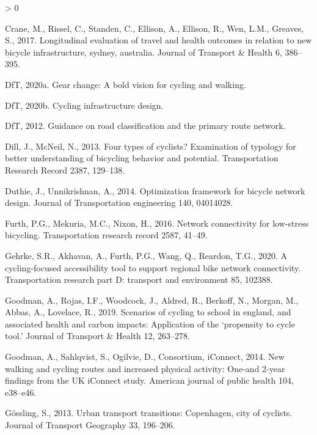 \documentclass[
]{article}
\newlength{\cslhangindent}
\newenvironment{CSLReferences}[2] %
 {%
  \setlength{\parindent}{0pt}
  \ifodd #1 \everypar{\setlength{\hangindent}{\cslhangindent}}\ignorespaces\fi
  \ifnum #2 > 0
  \setlength{\parskip}{#2\baselineskip}
  \fi
 }%
 {}
\begin{document}
\begin{CSLReferences}{1}{0}
\leavevmode\hypertarget{ref-crane2017longitudinal}{}%
Crane, M., Rissel, C., Standen, C., Ellison, A., Ellison, R., Wen, L.M., Greaves, S., 2017. Longitudinal evaluation of travel and health outcomes in relation to new bicycle infrastructure, sydney, australia. Journal of Transport \& Health 6, 386--395.

\leavevmode\hypertarget{ref-departmentgearchange2020}{}%
DfT, 2020a. Gear change: A bold vision for cycling and walking.

\leavevmode\hypertarget{ref-departmentcycleinfradesign2020}{}%
DfT, 2020b. Cycling infrastructure design.

\leavevmode\hypertarget{ref-department2012guidance}{}%
DfT, 2012. Guidance on road classification and the primary route network.

\leavevmode\hypertarget{ref-dill2013four}{}%
Dill, J., McNeil, N., 2013. Four types of cyclists? Examination of typology for better understanding of bicycling behavior and potential. Transportation Research Record 2387, 129--138.

\leavevmode\hypertarget{ref-duthie2014optimization}{}%
Duthie, J., Unnikrishnan, A., 2014. Optimization framework for bicycle network design. Journal of Transportation engineering 140, 04014028.

\leavevmode\hypertarget{ref-furth2016network}{}%
Furth, P.G., Mekuria, M.C., Nixon, H., 2016. Network connectivity for low-stress bicycling. Transportation research record 2587, 41--49.

\leavevmode\hypertarget{ref-gehrke2020cycling}{}%
Gehrke, S.R., Akhavan, A., Furth, P.G., Wang, Q., Reardon, T.G., 2020. A cycling-focused accessibility tool to support regional bike network connectivity. Transportation research part D: transport and environment 85, 102388.

\leavevmode\hypertarget{ref-goodman2019scenarios}{}%
Goodman, A., Rojas, I.F., Woodcock, J., Aldred, R., Berkoff, N., Morgan, M., Abbas, A., Lovelace, R., 2019. Scenarios of cycling to school in england, and associated health and carbon impacts: Application of the {`propensity to cycle tool.'} Journal of Transport \& Health 12, 263--278.

\leavevmode\hypertarget{ref-goodman2014new}{}%
Goodman, A., Sahlqvist, S., Ogilvie, D., Consortium, iConnect, 2014. New walking and cycling routes and increased physical activity: One-and 2-year findings from the UK iConnect study. American journal of public health 104, e38--e46.

\leavevmode\hypertarget{ref-gossling2013urban}{}%
Gössling, S., 2013. Urban transport transitions: Copenhagen, city of cyclists. Journal of Transport Geography 33, 196--206.


\end{CSLReferences}
\end{document}
